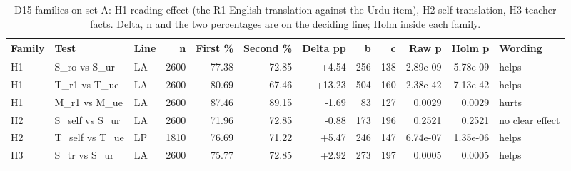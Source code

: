 \begin{table}[t]
\centering
\small
\caption{D15 families on set A: H1 reading effect (the R1 English translation against the Urdu item), H2 self-translation, H3 teacher facts. Delta, n and the two percentages are on the deciding line; Holm inside each family.}
\label{tab:d15-tests}
\begin{tabular}{lllrrrrrrrrl}
\toprule
Family & Test & Line & n & First \% & Second \% & Delta pp & b & c & Raw p & Holm p & Wording \\
\midrule
H1 & S\_ro vs S\_ur & LA & 2600 & 77.38 & 72.85 & +4.54 & 256 & 138 & 2.89e-09 & 5.78e-09 & helps \\
H1 & T\_r1 vs T\_ue & LA & 2600 & 80.69 & 67.46 & +13.23 & 504 & 160 & 2.38e-42 & 7.13e-42 & helps \\
H1 & M\_r1 vs M\_ue & LA & 2600 & 87.46 & 89.15 & -1.69 & 83 & 127 & 0.0029 & 0.0029 & hurts \\
H2 & S\_self vs S\_ur & LA & 2600 & 71.96 & 72.85 & -0.88 & 173 & 196 & 0.2521 & 0.2521 & no clear effect \\
H2 & T\_self vs T\_ue & LP & 1810 & 76.69 & 71.22 & +5.47 & 246 & 147 & 6.74e-07 & 1.35e-06 & helps \\
H3 & S\_tr vs S\_ur & LA & 2600 & 75.77 & 72.85 & +2.92 & 273 & 197 & 0.0005 & 0.0005 & helps \\
\bottomrule
\end{tabular}
\end{table}
